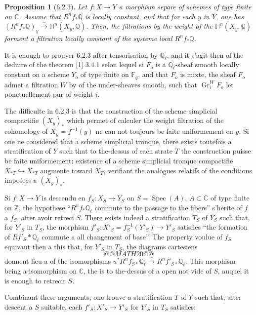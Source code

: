 \documentclass[12pt,a4paper]{article}
\theoremstyle{plain}
\newtheorem{proposition}[theorem]{Proposition}
\theoremstyle{definition}
\theoremstyle{remark}
\DeclareMathOperator{\Spec}{Spec}
\DeclareMathOperator{\Gr}{Gr}
\newcommand{\CC}{\mathbb{C}}
\newcommand{\FF}{\mathbb{F}}
\newcommand{\HH}{\mathbb{H}}
\newcommand{\QQ}{\mathbb{Q}}
\newcommand{\ZZ}{\mathbb{Z}}
\begin{document}
\begin{proposition}[6.2.3]
Let $f: X \to Y$ a morphism separe of schemes of type finite on $\CC$. Assume that $R^nf_*\QQ$ is locally constant, and that for each $y$ in $Y$, one has $(R^nf_*\QQ)_y \xrightarrow{\sim} \HH^n(X_y, \QQ)$. Then, the filtrations by the weight of the $\HH^n(X_y, \QQ)$ forment a filtration locally constant of the systeme local $R^nf_*\QQ$.
\end{proposition}

It is enough to prouver 6.2.3 after tensorisation by $\QQ_{\ell}$, and it s'agit then of the deduire of the theorem [1] 3.4.1 selon lequel si $F_o$ is a $\QQ_{\ell}$-sheaf smooth locally constant on a scheme $Y_o$ of type finite on $\FF_q$, and that $F_o$ is mixte, the sheaf $F_o$ admet a filtration $W$ by of the under-sheaves smooth, such that $\Gr_i^W F_o$ let ponctuellement pur of weight $i$.

The difficulte in 6.2.3 is that the construction of the scheme simplicial compactifie $(X_y)_*$ which permet of calculer the weight filtration of the cohomology of $X_y = f^{-1}(y)$ ne can not toujours be faite uniformement en $y$. Si one ne considered that a scheme simplicial tronque, there exists toutefois a stratification of $Y$ such that to the-dessus of each strate $T$ the construction puisse be faite uniformement: existence of a scheme simplicial tronque compactifie $X_{*T} \hookrightarrow \overline{X}_{*T}$ augmente toward $X_T$, verifiant the analogues relatifs of the conditions imposees a $(X_y)_*$.

Si $f: X \to Y$ is descendu en $f_S: X_S \to Y_S$ on $S = \Spec(A)$, $A \subset \CC$ of type finite on $\ZZ$, the hypothese ``$R^nf_*\QQ_{\ell}$ commute to the passage to the fibers'' s'herite of $f$ a $f_S$, after avoir retreci $S$. There exists indeed a stratification $T_S$ of $Y_S$ such that, for $Y'_S$ in $T_S$, the morphism $f'_S: X'_S = f_S^{-1}(Y'_S) \to Y'_S$ satisfies ``the formation of $Rf'_S*\QQ_{\ell}$ commute a all changement of base''. The property voulue of $f_S$ equivaut then a this that, for $Y'_S$ in $T_S$, the diagrams cartesiens
\[
@@MATH20@@
\]
donnent lieu a of the isomorphisms $u^*R^nf_{S*}\QQ_{\ell} \xrightarrow{\sim} R^nf'_{S*}\QQ_{\ell}$. This morphism being a isomorphism on $\CC$, the is to the-dessus of a open not vide of $S$, auquel it is enough to retrecir $S$.

Combinant these arguments, one trouve a stratification $T$ of $Y$ such that, after descent a $S$ suitable, each $f'_S: X'_S \to Y'_S$ for $Y'_S$ in $T_S$ satisfies:
\end{document}
